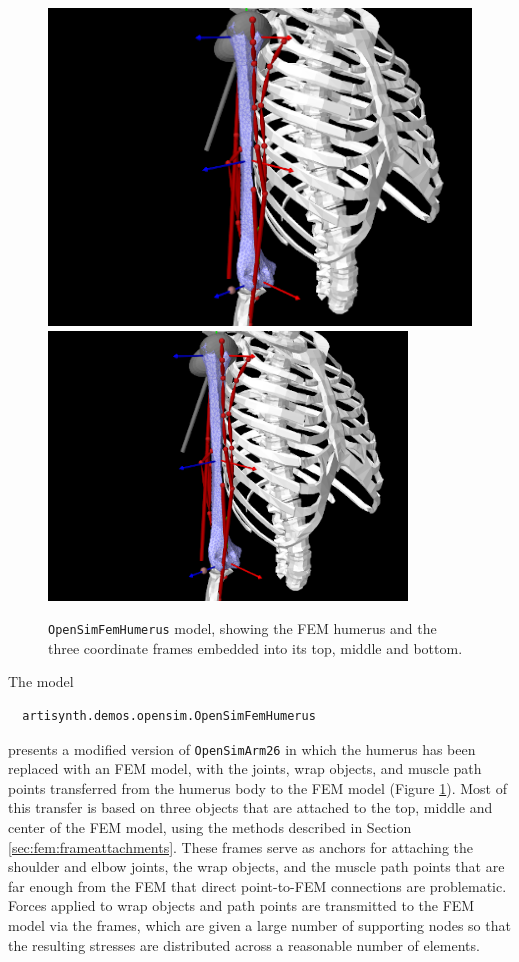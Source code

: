 \begin{figure}[ht]
\begin{center}
   \iflatexml 
      \includegraphics[]{images/OpenSimFemHumerus} 
   \else 
      \includegraphics[width=3.75in]{images/OpenSimFemHumerus} 
   \fi
\end{center}
\caption{{\tt OpenSimFemHumerus} model, showing the FEM humerus
and the three coordinate frames embedded into its top, middle and bottom.}
\label{OpenSimFemHumerus:fig}
\end{figure}

The model 
\begin{verbatim}
  artisynth.demos.opensim.OpenSimFemHumerus
\end{verbatim}
presents a modified version of {\tt OpenSimArm26} in which the humerus has been
replaced with an FEM model, with the joints, wrap objects, and muscle path
points transferred from the humerus body to the FEM model
(Figure \ref{OpenSimFemHumerus:fig}). Most of this transfer is based on
three  objects that are attached to the top, middle and
center of the FEM model, using the methods described in Section
\ref{sec:fem:frameattachments}. These frames serve as anchors for attaching the
shoulder and elbow joints, the wrap objects, and the muscle path points that
are far enough from the FEM that direct point-to-FEM connections are
problematic. Forces applied to wrap objects and path points are transmitted to
the FEM model via the frames, which are given a large number of supporting
nodes so that the resulting stresses are distributed across a reasonable number
of elements.

